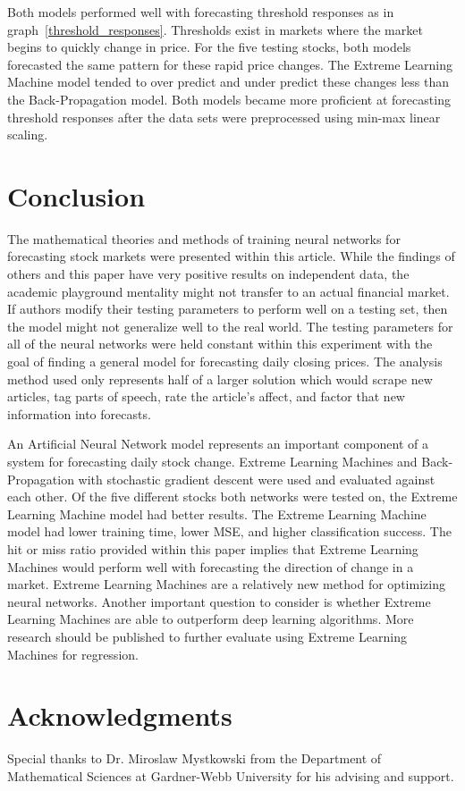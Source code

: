 \documentclass{ncjms}
\begin{document}
	Both models performed well with forecasting threshold responses as in graph~\ref{threshold_responses}.
	Thresholds exist in markets where the market begins to quickly change in price.
	For the five testing stocks, both models forecasted the same pattern for these rapid price changes.
	The Extreme Learning Machine model tended to over predict and under predict these changes less than the Back-Propagation model.
	Both models became more proficient at forecasting threshold responses after the data sets were preprocessed using min-max linear scaling.

	\section{Conclusion}\label{sec:conclusion}
	The mathematical theories and methods of training neural networks for forecasting stock markets were presented within this article.
	While the findings of others and this paper have very positive results on independent data, the academic playground mentality might not transfer to an actual financial market.
	If authors modify their testing parameters to perform well on a testing set, then the model might not generalize well to the real world.
	The testing parameters for all of the neural networks were held constant within this experiment with the goal of finding a general model for forecasting daily closing prices.
	The analysis method used only represents half of a larger solution which would scrape new articles, tag parts of speech, rate the article's affect, and factor that new information into forecasts.

	An Artificial Neural Network model represents an important component of a system for forecasting daily stock change.
	Extreme Learning Machines and Back-Propagation with stochastic gradient descent were used and evaluated against each other.
	Of the five different stocks both networks were tested on, the Extreme Learning Machine model had better results.
	The Extreme Learning Machine model had lower training time, lower MSE, and higher classification success.
	The hit or miss ratio provided within this paper implies that Extreme Learning Machines would perform well with forecasting the direction of change in a market.
	Extreme Learning Machines are a relatively new method for optimizing neural networks.
	Another important question to consider is whether Extreme Learning Machines are able to outperform deep learning algorithms.
	More research should be published to further evaluate using Extreme Learning Machines for regression.

	\section*{Acknowledgments}
	Special thanks to Dr. Miroslaw Mystkowski from the Department of Mathematical Sciences at Gardner-Webb University for his advising and support.

	
	
\end{document}
